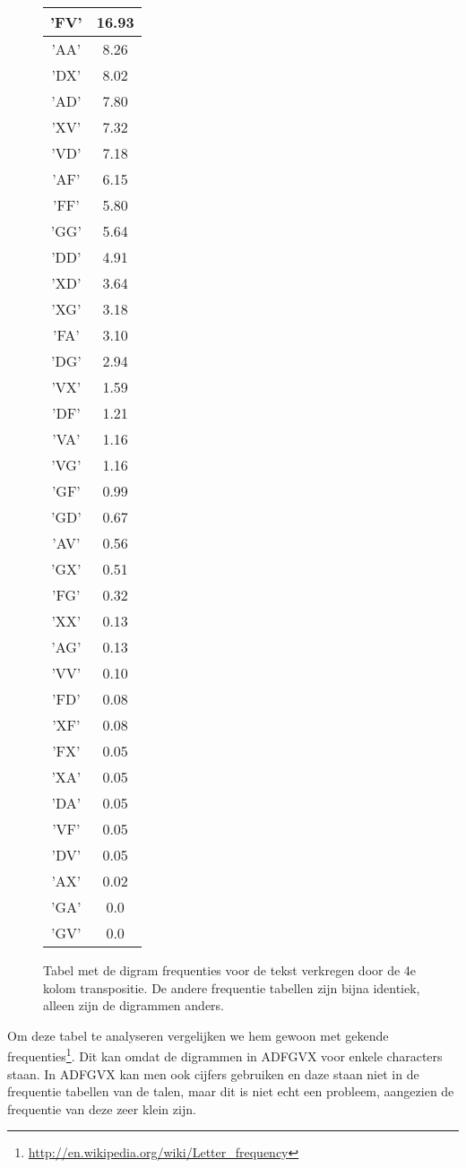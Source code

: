 \documentclass[a4paper,11pt]{article}
\begin{document}
\begin{figure}
\begin{center}
\begin{tabular}{|c|c|}
\hline
'FV'& 16.93 \\ \hline
'AA'& 8.26\\ \hline
'DX'& 8.02\\ \hline
'AD'& 7.80\\ \hline
'XV'& 7.32\\ \hline
'VD'& 7.18\\ \hline
'AF'& 6.15\\ \hline
'FF'& 5.80\\ \hline
'GG'& 5.64\\ \hline
'DD'& 4.91\\ \hline
'XD'& 3.64\\ \hline
'XG'& 3.18\\ \hline
'FA'& 3.10\\ \hline
'DG'& 2.94\\ \hline
'VX'& 1.59\\ \hline
'DF'& 1.21\\ \hline
'VA'& 1.16\\ \hline
'VG'& 1.16\\ \hline
'GF'& 0.99\\ \hline
'GD'& 0.67\\ \hline
'AV'& 0.56\\ \hline
'GX'& 0.51\\ \hline
'FG'& 0.32\\ \hline
'XX'& 0.13\\ \hline
'AG'& 0.13\\ \hline
'VV'& 0.10\\ \hline
'FD'& 0.08\\ \hline
'XF'& 0.08\\ \hline
'FX'& 0.05\\ \hline
'XA'& 0.05\\ \hline
'DA'& 0.05\\ \hline
'VF'& 0.05\\ \hline
'DV'& 0.05\\ \hline
'AX'& 0.02\\ \hline
'GA'& 0.0\\ \hline
'GV'& 0.0\\ \hline
\end{tabular}

\caption{ Tabel met de digram frequenties voor de tekst verkregen door de 4e kolom transpositie. De andere frequentie tabellen zijn bijna identiek, alleen zijn de digrammen anders.}
\end{center}

\end{figure}
Om deze tabel te analyseren vergelijken we hem gewoon met gekende frequenties\footnote{\url{http://en.wikipedia.org/wiki/Letter_frequency}}. Dit kan omdat de digrammen in ADFGVX voor enkele characters staan. In ADFGVX kan men ook cijfers gebruiken en daze staan niet in de frequentie tabellen van de talen, maar dit is niet echt een probleem, aangezien de frequentie van deze zeer klein zijn.
\end{document}
